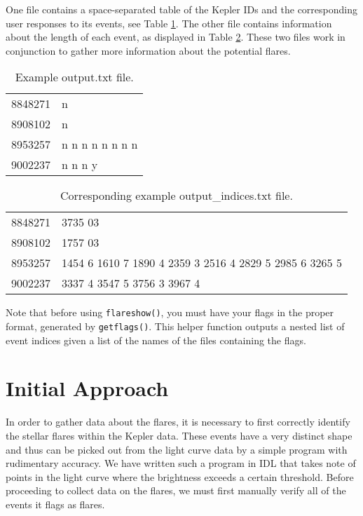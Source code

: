 \documentclass[11pt]{article}
\begin{document}
One file contains a space-separated table of the Kepler IDs and the
corresponding user responses to its events, see Table
\ref{tab:output}.  The other file contains information about the
length of each event, as displayed in Table \ref{tab:outputindices}.
These two files work in conjunction to gather more information about
the potential flares.
\begin{table}[h]
  \centering
  \begin{tabular}{l l}
    8848271 &  n \\
    8908102 &  n \\
    8953257 &  n  n  n  n  n  n  n  n \\
    9002237 &  n  n  n  y \\
  \end{tabular}
\caption{Example output.txt file.}
\label{tab:output}
\end{table}

\begin{table}[!h]
  \centering
  \begin{tabular}{l l}

8848271 &  3735 03 \\
8908102 &  1757 03 \\
8953257 &  1454  6 1610  7 1890  4 2359  3 2516  4 2829  5 2985  6
3265  5 \\
9002237 &  3337  4 3547  5 3756  3 3967  4 \\
\end{tabular}
\caption{Corresponding example output\_indices.txt file.}
\label{tab:outputindices}
\end{table}

Note that before using \verb|flareshow()|, you must have your flags in
the proper format, generated by \verb|getflags()|.  This helper
function outputs a nested list of event indices given a list of the
names of the files containing the flags.

\section{Initial Approach}
\label{sec:initial}
In order to gather data about the flares, it is necessary to first
correctly identify the stellar flares within the Kepler data.  These
events have a very distinct shape and thus can be picked out from the
light curve data by a simple program with rudimentary accuracy.  We
have written such a program in IDL that takes note of points in the
light curve where the brightness exceeds a certain threshold.  Before
proceeding to collect data on the flares, we must first manually
verify all of the events it flags as flares.
\end{document}
